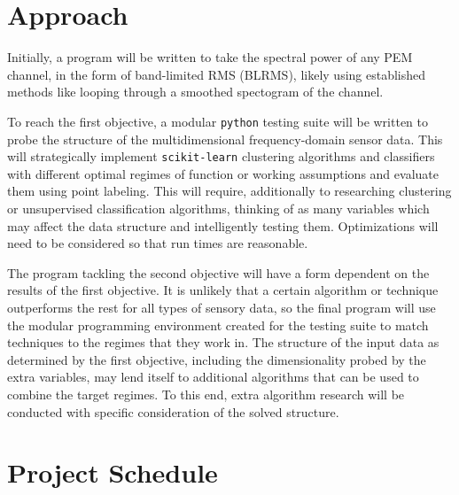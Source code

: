 \documentclass[colorlinks=true,pdfstartview=FitV,linkcolor=blue,
            citecolor=red,urlcolor=magenta]{ligodoc}
\begin{document}
\section{Approach}

Initially, a program will be written to take the spectral power of any PEM channel, in the form of band-limited RMS (BLRMS), likely using established methods like looping through a smoothed spectogram of the channel\cite{vajente}.

To reach the first objective, a modular \texttt{python} testing suite will be written to probe the structure of the multidimensional frequency-domain sensor data.
This will strategically implement \texttt{scikit-learn} clustering algorithms and classifiers with different optimal regimes of function or working assumptions and evaluate them using point labeling. 
This will require, additionally to researching clustering or unsupervised classification algorithms, thinking of as many variables which may affect the data structure and intelligently testing them. 
Optimizations will need to be considered so that run times are reasonable.

The program tackling the second objective will have a form dependent on the results of the first objective.
It is unlikely that a certain algorithm or technique outperforms the rest for all types of sensory data, so the final program will use the modular programming environment created for the testing suite to match techniques to the regimes that they work in.
The structure of the input data as determined by the first objective, including the dimensionality probed by the extra variables, may lend itself to additional algorithms that can be used to combine the target regimes.
To this end, extra algorithm research will be conducted with specific consideration of the solved structure.


\section{Project Schedule}
\end{document}
